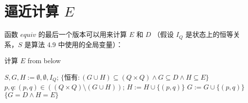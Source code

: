 \section{逼近计算 $E$ }

函数 $equiv$ 的最后一个版本可以用来计算 $E$ 和 $D$ （假设 $I_Q $ 是状态上的恒等关系，$S$ 是算法 4.9 中使用的全局变量）：

\begin{algorithm}
    \caption{计算 $E$ from below }\label{al:4-10}
    \small
    \begin{algorithmic}[1]
        \State $S,G,H:=\emptyset,\emptyset,I_Q$;
        \State $\{\mbox{{恒有}}: (G\cup H) \subseteq (Q \times Q) \land G \subseteq D \land H \subseteq E \}$
             $p,q : (p,q) \in ( ( Q\times Q) \setminus ( G \cup H) )$;
                $H:=H \cup \{ (p,q) \}$
                $G:=G \cup \{ (p,q) \}$
            \EndIf
        \Until  $ \{ G=D \land H = E \} $
    \end{algorithmic}
\end{algorithm}

